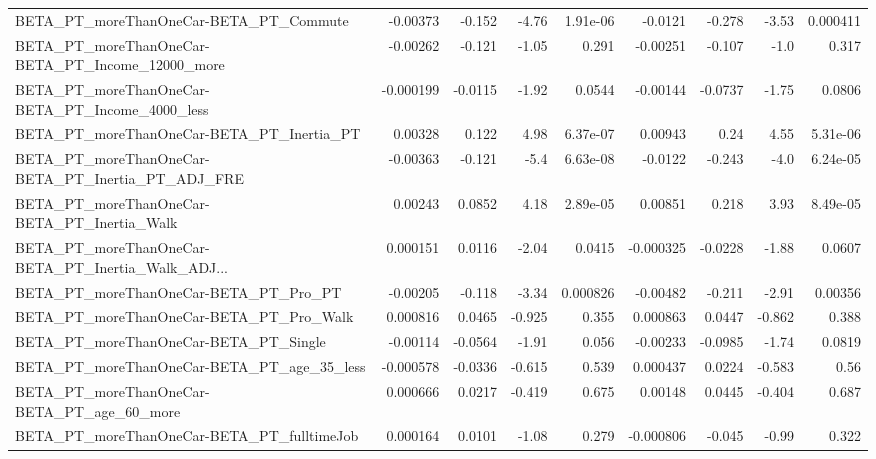 \begin{tabular}{lrrrrrrrr}
BETA\_PT\_moreThanOneCar-BETA\_PT\_Commute             &    -0.00373 &       -0.152 &    -4.76 & 1.91e-06 &    -0.0121 &      -0.278 &        -3.53 &      0.000411 \\
BETA\_PT\_moreThanOneCar-BETA\_PT\_Income\_12000\_more   &    -0.00262 &       -0.121 &    -1.05 &    0.291 &   -0.00251 &      -0.107 &         -1.0 &         0.317 \\
BETA\_PT\_moreThanOneCar-BETA\_PT\_Income\_4000\_less    &   -0.000199 &      -0.0115 &    -1.92 &   0.0544 &   -0.00144 &     -0.0737 &        -1.75 &        0.0806 \\
BETA\_PT\_moreThanOneCar-BETA\_PT\_Inertia\_PT          &     0.00328 &        0.122 &     4.98 & 6.37e-07 &    0.00943 &        0.24 &         4.55 &      5.31e-06 \\
BETA\_PT\_moreThanOneCar-BETA\_PT\_Inertia\_PT\_ADJ\_FRE  &    -0.00363 &       -0.121 &     -5.4 & 6.63e-08 &    -0.0122 &      -0.243 &         -4.0 &      6.24e-05 \\
BETA\_PT\_moreThanOneCar-BETA\_PT\_Inertia\_Walk        &     0.00243 &       0.0852 &     4.18 & 2.89e-05 &    0.00851 &       0.218 &         3.93 &      8.49e-05 \\
BETA\_PT\_moreThanOneCar-BETA\_PT\_Inertia\_Walk\_ADJ... &    0.000151 &       0.0116 &    -2.04 &   0.0415 &  -0.000325 &     -0.0228 &        -1.88 &        0.0607 \\
BETA\_PT\_moreThanOneCar-BETA\_PT\_Pro\_PT              &    -0.00205 &       -0.118 &    -3.34 & 0.000826 &   -0.00482 &      -0.211 &        -2.91 &       0.00356 \\
BETA\_PT\_moreThanOneCar-BETA\_PT\_Pro\_Walk            &    0.000816 &       0.0465 &   -0.925 &    0.355 &   0.000863 &      0.0447 &       -0.862 &         0.388 \\
BETA\_PT\_moreThanOneCar-BETA\_PT\_Single              &    -0.00114 &      -0.0564 &    -1.91 &    0.056 &   -0.00233 &     -0.0985 &        -1.74 &        0.0819 \\
BETA\_PT\_moreThanOneCar-BETA\_PT\_age\_35\_less         &   -0.000578 &      -0.0336 &   -0.615 &    0.539 &   0.000437 &      0.0224 &       -0.583 &          0.56 \\
BETA\_PT\_moreThanOneCar-BETA\_PT\_age\_60\_more         &    0.000666 &       0.0217 &   -0.419 &    0.675 &    0.00148 &      0.0445 &       -0.404 &         0.687 \\
BETA\_PT\_moreThanOneCar-BETA\_PT\_fulltimeJob         &    0.000164 &       0.0101 &    -1.08 &    0.279 &  -0.000806 &      -0.045 &        -0.99 &         0.322 \\

\end{tabular}
